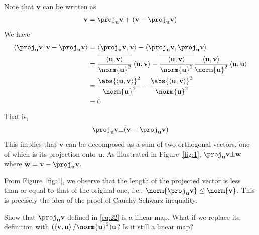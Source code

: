 \documentclass[thmcnt=section, color=blue, 12pt]{my-elegantbook}
\begin{document}
\par Note that $\mathbf{v}$ can be written as 
\begin{align*}
    \mathbf{v} = \proj_{\mathbf{u}} \mathbf{v} + (\mathbf{v} - \proj_{\mathbf{u}} \mathbf{v})
\end{align*}
We have 
\begin{align*}
    \left\langle 
        \proj_{\mathbf{u}} \mathbf{v},
        \mathbf{v} - \proj_{\mathbf{u}} \mathbf{v}
    \right\rangle
    &= \left\langle
        \proj_{\mathbf{u}} \mathbf{v},
        \mathbf{v}
    \right\rangle
    - \left\langle
        \proj_{\mathbf{u}} \mathbf{v},
        \proj_{\mathbf{u}} \mathbf{v}
    \right\rangle \\ 
    &= \overline{\frac{\left\langle \mathbf{u}, \mathbf{v} \right\rangle}{\norm{\mathbf{u}}^2}} \left\langle \mathbf{u}, \mathbf{v} \right\rangle
    -  \overline{\frac{\left\langle \mathbf{u}, \mathbf{v} \right\rangle}{\norm{\mathbf{u}}^2}} \frac{\left\langle \mathbf{u}, \mathbf{v} \right\rangle}{\norm{\mathbf{u}}^2} \left\langle \mathbf{u}, \mathbf{u} \right\rangle \\ 
    &= \frac{\abs{\left\langle \mathbf{u}, \mathbf{v} \right\rangle}^2}{\norm{\mathbf{u}}^2} - \frac{\abs{\left\langle \mathbf{u}, \mathbf{v} \right\rangle}^2}{\norm{\mathbf{u}}^2} \\ 
    &= 0
\end{align*}
That is, 
\begin{align}
    \proj_{\mathbf{u}} \mathbf{v} \bot (\mathbf{v} - \proj_{\mathbf{u}} \mathbf{v}) 
    \label{eq:23}
\end{align}
This implies that $\mathbf{v}$ can be decomposed as a sum of two orthogonal vectors, one of which is its projection onto $\mathbf{u}$. As illustrated in Figure~\ref{fig:1}, $\proj_{\mathbf{u}} \mathbf{v} \bot \mathbf{w}$ where $\mathbf{w} = \mathbf{v} - \proj_{\mathbf{u}} \mathbf{v}$.

\par From Figure~\ref{fig:1}, we observe that the length of the projected vector is less than or equal to that of the original one, i.e., $\norm{\proj_{\mathbf{u}} \mathbf{v}} \leq \norm{\mathbf{v}}$. This is precisely the idea of the proof of Cauchy-Schwarz inequality.

\begin{exercise} \label{ex:1}
    Show that $\proj_\mathbf{u} \mathbf{v}$ defined in \eqref{eq:22} is a linear map. What if we replace its definition with $(\left\langle \mathbf{v}, \mathbf{u} \right\rangle / \norm{\mathbf{u}}^2) \mathbf{u}$? Is it still a linear map?
\end{exercise}
\end{document}
